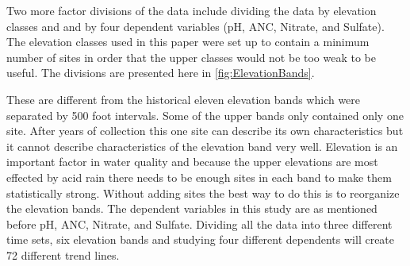  Two more factor divisions of the data include dividing the data by elevation classes and and by four dependent variables (pH, ANC, Nitrate, and Sulfate).  The elevation classes used in this paper were set up to contain a minimum number of sites in order that the upper classes would not be too weak to be useful.  The divisions are presented here in \autoref{fig:ElevationBands}.

These are different from the historical eleven elevation bands which were separated by 500 foot intervals.  Some of the upper bands only contained only one site.  After years of collection this one site can describe its own characteristics but it cannot describe characteristics of the elevation band very well.  Elevation is an important factor in water quality and because the upper elevations are most effected by acid rain there needs to be enough sites in each band to make them statistically strong.  Without adding sites the best way to do this is to reorganize the elevation bands.  The dependent variables in this study are as mentioned before pH, ANC, Nitrate, and Sulfate.  %
Dividing all the data into three different time sets, six elevation bands and studying four different dependents will create 72 different trend lines.

